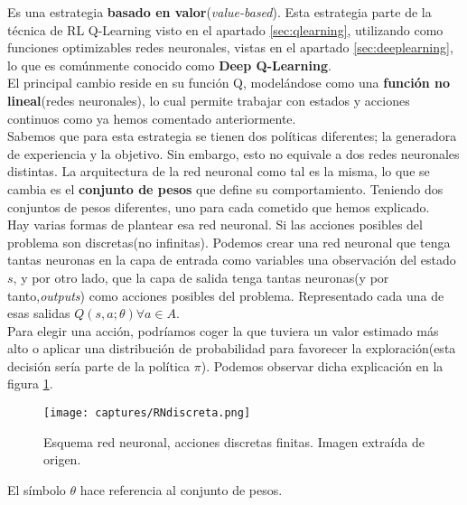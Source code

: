 \documentclass[11pt,fleqn]{book} %
\begin{document}
Es una estrategia \textbf{basado en valor}(\textit{value-based}). Esta estrategia parte de la técnica de RL Q-Learning visto en el apartado \ref{sec:qlearning}, utilizando como funciones optimizables redes neuronales, vistas en el apartado \ref{sec:deeplearning}, lo que es comúnmente conocido como \textbf{Deep Q-Learning}.\\

El principal cambio reside en su función Q, modelándose como una \textbf{función no lineal}(redes neuronales), lo cual permite trabajar con estados y acciones continuos como ya hemos comentado anteriormente. \\

Sabemos que para esta estrategia se tienen dos políticas diferentes; la generadora de experiencia y la objetivo. Sin embargo, esto no equivale a dos redes neuronales distintas. La arquitectura de la red neuronal como tal es la misma, lo que se cambia es el \textbf{conjunto de pesos} que define su comportamiento. Teniendo dos conjuntos de pesos diferentes, uno para cada cometido que hemos explicado. \\

Hay varias formas de plantear esa red neuronal. Si las acciones posibles del problema son discretas(no infinitas). Podemos crear una red neuronal que tenga tantas neuronas en la capa de entrada como variables una observación del estado $s$, y por otro lado, que la capa de salida tenga tantas neuronas(y por tanto,\textit{outputs}) como acciones posibles del problema. Representado cada una de esas salidas $Q(s,a;\theta) \forall a \in A$. \\

Para elegir una acción, podríamos coger la que tuviera un valor estimado más alto o aplicar una distribución de probabilidad para favorecer la exploración(esta decisión sería parte de la política $\pi$). Podemos observar dicha explicación en la figura \ref{fig:RNdiscreta}.

\begin{figure}[H]
	\centering\texttt{[image: captures/RNdiscreta.png]}
	\caption{Esquema red neuronal, acciones discretas finitas. Imagen extraída de origen. \cite{article:RLromero}}
	\label{fig:RNdiscreta} %
\end{figure}

El símbolo $\theta$ hace referencia al conjunto de pesos. \\
\end{document}
